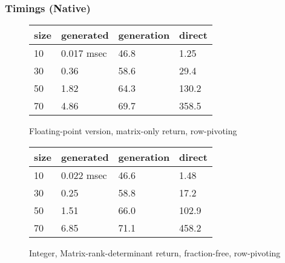 \documentclass{beamer}
\begin{document}
\begin{frame}
\frametitle{Timings (Native)}

\begin{figure}
\begin{tabular}{l|l|l|l}
    size & generated & generation & direct \\ \hline
    10 & 0.017 msec & 46.8 & 1.25 \\
    30 & 0.36       & 58.6 & 29.4 \\
    50 & 1.82       & 64.3 & 130.2 \\
    70 & 4.86       & 69.7 & 358.5 \\
\end{tabular}
\caption{Floating-point version, matrix-only return, row-pivoting}
\end{figure}

\begin{figure}
\begin{tabular}{l|l|l|l}
    size & generated & generation & direct \\ \hline
    10 & 0.022 msec & 46.6 & 1.48 \\
    30 & 0.25       & 58.8 & 17.2 \\
    50 & 1.51       & 66.0 & 102.9 \\
    70 & 6.85       & 71.1 & 458.2 \\
\end{tabular}
\caption{Integer, Matrix-rank-determinant return, fraction-free, row-pivoting}
\end{figure}
\end{frame}
\end{document}
